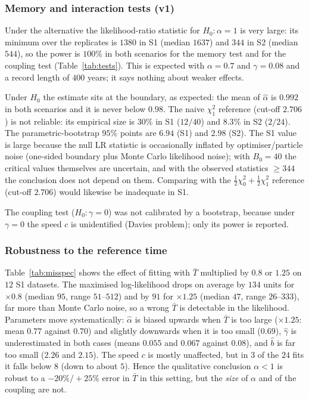 \documentclass[11pt,a4paper]{article}
\newcommand{\Tb}{\bar T}
\begin{document}
\subsubsection*{Memory and interaction tests (v1)}
Under the alternative the likelihood-ratio statistic for $H_0:\alpha=1$ is very large: its minimum over the replicates is $1380$ in S1 (median $1637$) and $344$ in S2 (median $544$), so the power is $100\%$ in both scenarios for the memory test and for the coupling test (Table~\ref{tab:tests}). This is expected with $\alpha=0.7$ and $\gamma=0.08$ and a record length of $400$ years; it says nothing about weaker effects.

Under $H_0$ the estimate sits at the boundary, as expected: the mean of $\hat\alpha$ is $0.992$ in both scenarios and it is never below $0.98$. The naive $\chi^2_1$ reference (cut-off $2.706$) is not reliable: its empirical size is $30\%$ in S1 ($12/40$) and $8.3\%$ in S2 ($2/24$). The parametric-bootstrap $95\%$ points are $6.94$ (S1) and $2.98$ (S2). The S1 value is large because the null LR statistic is occasionally inflated by optimiser/particle noise (one-sided boundary plus Monte Carlo likelihood noise); with $B_0=40$ the critical values themselves are uncertain, and with the observed statistics $\ge344$ the conclusion does not depend on them. Comparing with the $\tfrac12\chi^2_0+\tfrac12\chi^2_1$ reference (cut-off $2.706$) would likewise be inadequate in S1.

\begin{table}[t]
\centering\small

\caption{Tests of memory ($H_0:\alpha=1$) and coupling ($H_0:\gamma=0$). ``Type I'': rejection rate of the $\chi^2$ reference under the null datasets; critical value: bootstrap $95\%$ point. Power over the valid alternative replicates ($19$ in S1, $9$ in S2).}\label{tab:tests}
\end{table}
The coupling test ($H_0:\gamma=0$) was not calibrated by a bootstrap, because under $\gamma=0$ the speed $c$ is unidentified (Davies problem); only its power is reported.

\subsubsection*{Robustness to the reference time}\label{sec:robres}
Table~\ref{tab:misspec} shows the effect of fitting with $\Tb$ multiplied by $0.8$ or $1.25$ on $12$ S1 datasets. The maximised log-likelihood drops on average by $134$ units for $\times0.8$ (median $95$, range $51$--$512$) and by $91$ for $\times1.25$ (median $47$, range $26$--$333$), far more than Monte Carlo noise, so a wrong $\Tb$ is detectable in the likelihood. Parameters move systematically: $\hat\alpha$ is biased upwards when $\Tb$ is too large ($\times1.25$: mean $0.77$ against $0.70$) and slightly downwards when it is too small ($0.69$), $\hat\gamma$ is underestimated in both cases (means $0.055$ and $0.067$ against $0.08$), and $\hat b$ is far too small ($2.26$ and $2.15$). The speed $c$ is mostly unaffected, but in $3$ of the $24$ fits it falls below $8$ (down to about $5$). Hence the qualitative conclusion $\alpha<1$ is robust to a $-20\%/+25\%$ error in $\Tb$ in this setting, but the \emph{size} of $\alpha$ and of the coupling are not.
\end{document}
